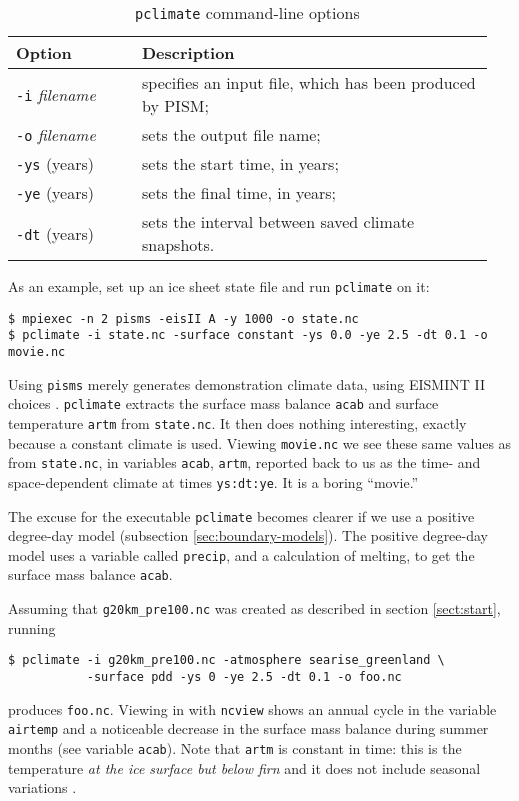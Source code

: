 \documentclass[titlepage,letterpaper,final]{scrartcl}
\newcommand{\txtopt}[2]{\texttt{-#1} #2\optindex{\texttt{-#1} #2}}
\newcommand{\fileopt}[1]{\txtopt{#1}{\emph{filename}}}
\begin{document}
\begin{table}[ht]
  \centering
  \caption{\texttt{pclimate} command-line options}
  \begin{tabular}{p{0.25\linewidth}p{0.7\linewidth}}\toprule
    \textbf{Option} & \textbf{Description}\\
    \midrule
    \fileopt{i} & specifies an input file, which has been produced by PISM;\\
    \fileopt{o} & sets the output file name;\\
    \txtopt{ys}{(years)} & sets the start time, in years;\\
    \txtopt{ye}{(years)} & sets the final time, in years;\\
    \txtopt{dt}{(years)} & sets the interval between saved climate snapshots.\\
    \bottomrule
 \end{tabular}
 \label{tab:pclimate}
\end{table}

\bigskip
As an example, set up an ice sheet state file and run \texttt{pclimate} on it:
\begin{verbatim}
$ mpiexec -n 2 pisms -eisII A -y 1000 -o state.nc
$ pclimate -i state.nc -surface constant -ys 0.0 -ye 2.5 -dt 0.1 -o movie.nc
\end{verbatim}
Using \texttt{pisms} merely generates demonstration climate data, using
EISMINT II choices \cite{EISMINT00}.  \texttt{pclimate} extracts the 
surface mass balance \texttt{acab} and surface temperature \texttt{artm} from \texttt{state.nc}.
It then does nothing interesting, exactly because a constant climate
is used.  Viewing \texttt{movie.nc} we see these same values as from \texttt{state.nc},
in variables \texttt{acab}, \texttt{artm}, reported back to us as the time- and space-dependent
climate at times \texttt{ys:dt:ye}.  It is a boring ``movie.''

The excuse for the executable \texttt{pclimate} becomes clearer if we use a positive degree-day
model (subsection \ref{sec:boundary-models}).  The positive degree-day
model uses a variable called \texttt{precip}, and a calculation of melting, to get the
surface mass balance \texttt{acab}. 

Assuming that \texttt{g20km_pre100.nc} was created as described in section
\ref{sect:start}, running
\begin{verbatim}
$ pclimate -i g20km_pre100.nc -atmosphere searise_greenland \
           -surface pdd -ys 0 -ye 2.5 -dt 0.1 -o foo.nc
\end{verbatim}%
produces \texttt{foo.nc}. Viewing in with \texttt{ncview} shows an annual cycle
in the variable \texttt{airtemp} and a noticeable decrease in the surface mass
balance during summer months (see variable \texttt{acab}). Note that
\texttt{artm} is constant in time: this is the temperature \emph{at the ice
  surface but below firn} and it does not include seasonal variations \cite{Hock05}.
\end{document}
